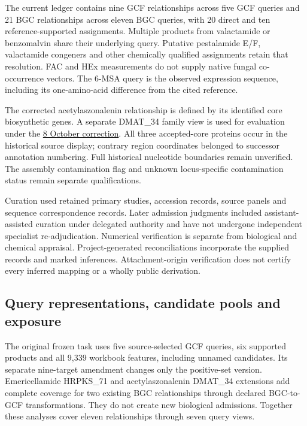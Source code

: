 \documentclass[
  10pt,
  a4paper,
]{article}
\begin{document}
The current ledger contains nine GCF relationships across five GCF queries and 21 BGC relationships across eleven BGC queries, with 20 direct and ten reference-supported assignments. Multiple products from valactamide or benzomalvin share their underlying query. Putative pestalamide E/F, valactamide congeners and other chemically qualified assignments retain that resolution. FAC and HEx measurements do not supply native fungal co-occurrence vectors. The 6-MSA query is the observed expression sequence, including its one-amino-acid difference from the cited reference.

The corrected acetylaszonalenin relationship is defined by its identified core biosynthetic genes. A separate DMAT\_34 family view is used for evaluation under the \href{https://github.com/vinvomero/fungallink-benchmark/blob/main/protocol/decisions/2026-10-08-acetylaszonalenin-family-source-correction.md}{8 October correction}. All three accepted-core proteins occur in the historical source display; contrary region coordinates belonged to successor annotation numbering. Full historical nucleotide boundaries remain unverified. The assembly contamination flag and unknown locus-specific contamination status remain separate qualifications.

Curation used retained primary studies, accession records, source panels and sequence correspondence records. Later admission judgments included assistant-assisted curation under delegated authority and have not undergone independent specialist re-adjudication. Numerical verification is separate from biological and chemical appraisal. Project-generated reconciliations incorporate the supplied records and marked inferences. Attachment-origin verification does not certify every inferred mapping or a wholly public derivation.

\subsection{Query representations, candidate pools and exposure}\label{query-representations-candidate-pools-and-exposure}

The original frozen task uses five source-selected GCF queries, six supported products and all 9,339 workbook features, including unnamed candidates. Its separate nine-target amendment changes only the positive-set version. Emericellamide HRPKS\_71 and acetylaszonalenin DMAT\_34 extensions add complete coverage for two existing BGC relationships through declared BGC-to-GCF transformations. They do not create new biological admissions. Together these analyses cover eleven relationships through seven query views.
\end{document}
